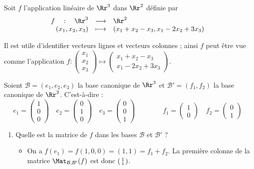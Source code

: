 \documentclass[class=report,crop=false]{standalone}
\begin{document}
\begin{exemple}
Soit $f$ l'application linéaire de $\Rr^3$ dans $\Rr^2$ définie
par
$$\begin{array}{rcl}
f \quad : \quad \Rr^3& \longrightarrow & \Rr^2\\
(x_1,x_2,x_3)&\longmapsto & (x_1+x_2-x_3, x_1-2x_2+3x_3)\\
\end{array}$$

Il est utile d'identifier vecteurs lignes et vecteurs colonnes ; ainsi $f$ peut être vue comme l'application
$f  : \left(\begin{smallmatrix} x_1\\x_2\\x_3 \end{smallmatrix}\right)
\mapsto \left(\begin{smallmatrix} x_1+x_2-x_3 \\ x_1-2x_2+3x_3 \end{smallmatrix}\right)$.

Soient $\mathcal{B} = (e_1,e_2,e_3)$ la base canonique de $\Rr^3$ et
$\mathcal{B}' = (f_1,f_2)$ la base canonique de $\Rr^2$. C'est-à-dire :
$$
e_1 = \begin{pmatrix}1\\0\\0\end{pmatrix} \quad
e_2 = \begin{pmatrix}0\\1\\0\end{pmatrix} \quad
e_3 = \begin{pmatrix}0\\0\\1\end{pmatrix} \qquad\qquad
f_1 = \begin{pmatrix}1\\0\end{pmatrix} \quad
f_2 = \begin{pmatrix}0\\1\end{pmatrix}$$

\begin{enumerate}
  \item Quelle est la matrice de $f$ dans les bases $\mathcal{B}$ et $\mathcal{B}'$ ?
  \begin{itemize}
    \item On a $f(e_1) = f(1,0,0) =(1,1)=f_1+f_2$.
    La première colonne de la matrice $\Mat_{\mathcal{B},\mathcal{B}'}(f)$
    est donc $\left(\begin{smallmatrix}1\cr1\cr\end{smallmatrix}\right)$.


\end{itemize}
\end{enumerate}
\end{exemple}
\end{document}
